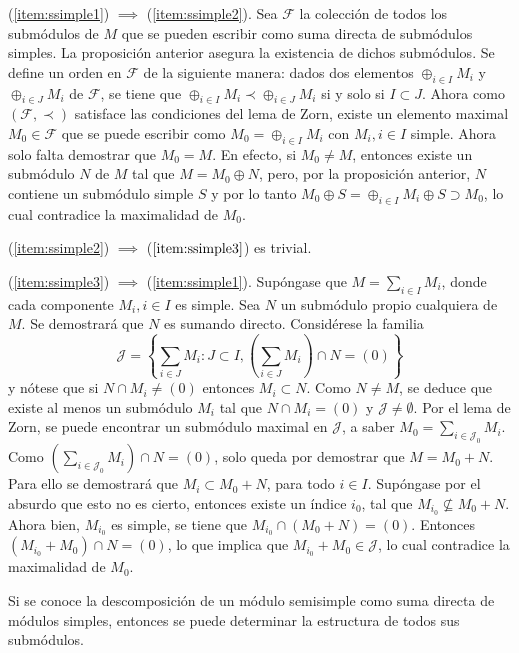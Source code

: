 \begin{proof*}
(\ref{item:ssimple1}) $\implies$ (\ref{item:ssimple2}). Sea $\mathcal{F}$ la colección de todos los submódulos de $M$ que se pueden escribir como suma directa de submódulos simples. La proposición anterior asegura la existencia de dichos submódulos. Se define un orden en $\mathcal{F}$ de la siguiente manera: dados dos elementos $\oplus_{i \in I}M_i$ y $\oplus_{i \in J}M_i$ de $\mathcal{F}$, se tiene que $\oplus_{i \in I}M_i  \prec \oplus_{i \in J}M_i$ si y solo si $I \subset J$. 
Ahora como $(\mathcal{F, \prec})$ satisface las condiciones del lema de Zorn, existe un elemento maximal $M_0 \in \mathcal{F}$ que se puede escribir como $M_0 = \oplus_{i \in I}M_i$ con $M_i, i \in I$ simple.
Ahora solo falta demostrar que $M_0 = M$. En efecto, si $M_0 \neq M$, entonces existe un submódulo $N$ de $M$ tal que $M = M_0 \oplus N$, pero, por la proposición anterior, $N$ contiene un submódulo simple $S$ y por lo tanto $M_0 \oplus S = \oplus_{i \in I}M_i \oplus S \supset M_0$, lo cual contradice la maximalidad de $M_0$.

(\ref{item:ssimple2}) $\implies$ ($\ref{item:ssimple3}$) es trivial.

(\ref{item:ssimple3}) $\implies$ (\ref{item:ssimple1}). Supóngase que $M = \sum_{i \in I}M_i$, donde cada componente $M_i, i \in I$ es simple. Sea $N$ un submódulo propio cualquiera de $M$. Se demostrará que $N$ es sumando directo. 
Considérese la familia \[ \mathcal{J} = \left\{ \sum_{i \in J} M_i \colon J \subset I, \left(\sum_{i \in J}M_i \right) \cap N = (0)  \right\} \] y nótese que si $N \cap M_i \neq (0)$ entonces $M_i \subset N$. Como $N \neq M$, se deduce que existe al menos un submódulo $M_i$ tal que $N \cap M_i = (0)$ y $\mathcal{J} \neq \emptyset$. Por el lema de Zorn, se puede encontrar un submódulo maximal en $\mathcal{J}$, a saber $M_0 = \sum_{i \in \mathcal{J}_0}M_i$. Como $\left( \sum_{i \in \mathcal{J}_0}M_i  \right) \cap N = (0)$, solo queda por demostrar que $M = M_0 + N$. Para ello se demostrará que $M_i \subset M_0 + N$, para todo $i \in I$. Supóngase por el absurdo que esto no es cierto, entonces existe un índice $i_{0}$, tal que $M_{i_0} \nsubseteq M_0 + N $. Ahora bien, $M_{i_0}$ es simple, se tiene que $M_{i_0} \cap (M_0 + N) = (0)$. Entonces $(M_{i_0} + M_0)\cap N =(0)$, lo que implica que $M_{i_0} + M_0 \in \mathcal{J}$, lo cual contradice la maximalidad de $M_0$.
\end{proof*}
Si se conoce la descomposición de un módulo semisimple como suma directa de módulos simples, entonces se puede determinar la estructura de todos sus submódulos. 
